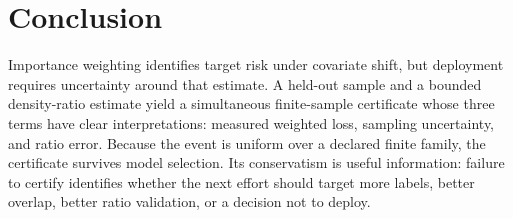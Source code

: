 \section{Conclusion}
\label{sec:conclusion}

Importance weighting identifies target risk under covariate shift, but deployment
requires uncertainty around that estimate.  A held-out sample and a bounded
density-ratio estimate yield a simultaneous finite-sample certificate whose three
terms have clear interpretations: measured weighted loss, sampling uncertainty,
and ratio error.  Because the event is uniform over a declared finite family, the
certificate survives model selection.  Its conservatism is useful information:
failure to certify identifies whether the next effort should target more labels,
better overlap, better ratio validation, or a decision not to deploy.
